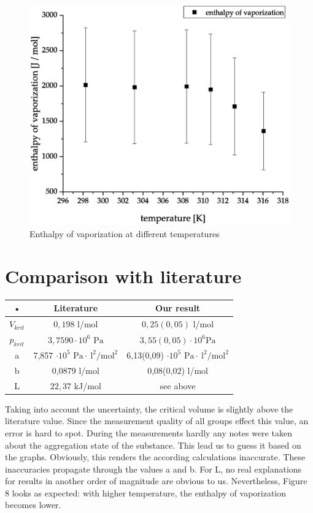 \documentclass[10pt,a4paper]{article}
\begin{document}
\begin{figure}[hbt!]
\includegraphics[width=400pt, center]{enthalpy-vs-temperature.eps}
\caption{Enthalpy of vaporization at different temperatures}
\label{fig:length_eight_mouse}
\end{figure}

\section{Comparison with literature}
\begin{center}
\begin{tabular}{|c|c|c|}
\hline 
• & Literature & Our result \\ 
\hline 
$V_{krit}$ & $0,198$ l/mol \cite{data} & $0,25(0,05)$ l/mol \\ 
\hline 
$p_{krit}$ & $3,7590 \cdot 10^6  \textrm{ Pa}$  & $3,55(0,05) \cdot 10^6 \textrm{Pa}$ \\ 
\hline 
a & 7,857 $\cdot 10^5  \textrm{ Pa} \cdot \ \textrm{l}^2 / \textrm{mol}^2$ \cite{handbook} & 6,13(0,09) $\cdot 10^5 \textrm{ Pa} \cdot \ \textrm{l}^2 / \textrm{mol}^2$ \\ 
\hline 
b & 0,0879 l/mol \cite{handbook} & 0,08(0,02) l/mol \\ 
\hline 
L & $ 22,37$ kJ/mol \cite{handbook} & see above \\ 
\hline 
\end{tabular} 
\end{center}

Taking into account the uncertainty, the critical volume is slightly above the literature value. Since the measurement quality of all groups effect this value, an error is hard to spot. During the measurements hardly any notes were taken about the aggregation state of the substance. This lead us to guess it based on the graphs. Obviously, this renders the according calculations inaccurate. These inaccuracies propagate through the values a and b. For L, no real explanations for results in another order of magnitude are obvious to us. Nevertheless, Figure 8 looks as expected: with higher temperature, the enthalpy of vaporization becomes lower.
\end{document}
